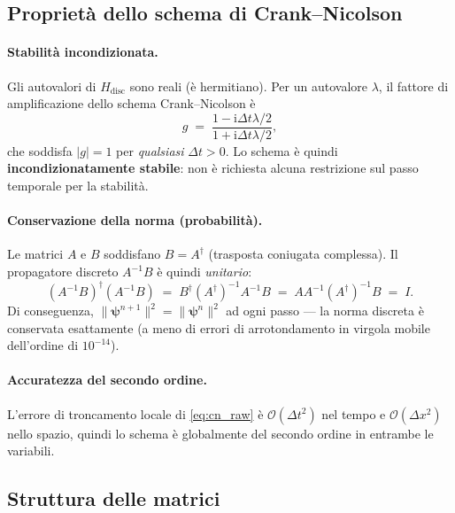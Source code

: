 \documentclass[12pt, a4paper]{article}
\newcommand{\dt}{\Delta t}
\newcommand{\dx}{\Delta x}
\newcommand{\ii}{\mathrm{i}}          %
\newcommand{\CN}{Crank--Nicolson}
\begin{document}
\subsection{Proprietà dello schema di Crank--Nicolson}
\label{sec:cn_properties}

\paragraph{Stabilità incondizionata.}
Gli autovalori di $H_\text{disc}$ sono reali (è hermitiano). Per un
autovalore $\lambda$, il fattore di amplificazione dello schema \CN{} è
\begin{equation}
  g \;=\; \frac{1 - \ii\dt\lambda/2}{1 + \ii\dt\lambda/2},
\end{equation}
che soddisfa $|g| = 1$ per \emph{qualsiasi} $\dt > 0$. Lo schema è
quindi \textbf{incondizionatamente stabile}: non è richiesta alcuna
restrizione sul passo temporale per la stabilità.

\paragraph{Conservazione della norma (probabilità).}
Le matrici $A$ e $B$ soddisfano $B = A^\dagger$ (trasposta coniugata
complessa). Il propagatore discreto $A^{-1}B$ è quindi \emph{unitario}:
\begin{equation}
  (A^{-1}B)^\dagger (A^{-1}B)
  \;=\; B^\dagger (A^\dagger)^{-1} A^{-1} B
  \;=\; A A^{-1} (A^\dagger)^{-1} B
  \;=\; I.
\end{equation}
Di conseguenza, $\|\boldsymbol{\psi}^{n+1}\|^2 = \|\boldsymbol{\psi}^n\|^2$
ad ogni passo — la norma discreta è conservata esattamente (a meno di
errori di arrotondamento in virgola mobile dell'ordine di $10^{-14}$).

\paragraph{Accuratezza del secondo ordine.}
L'errore di troncamento locale di \eqref{eq:cn_raw} è $\mathcal{O}(\dt^2)$
nel tempo e $\mathcal{O}(\dx^2)$ nello spazio, quindi lo schema è
globalmente del secondo ordine in entrambe le variabili.

\subsection{Struttura delle matrici}
\end{document}
